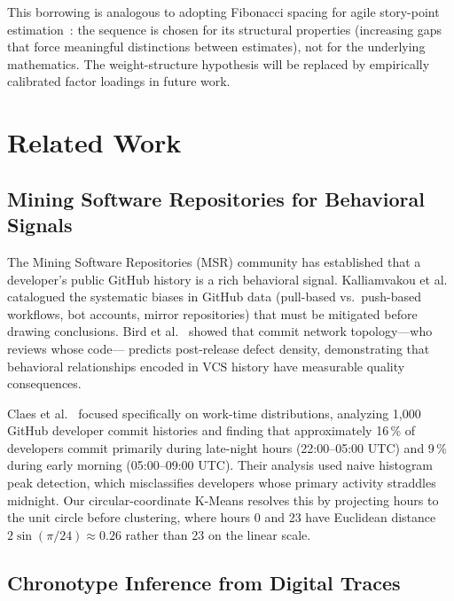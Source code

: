 \documentclass[conference]{IEEEtran}
\begin{document}
This borrowing is analogous to adopting Fibonacci spacing for agile
story-point estimation~\cite{wainer2000}: the sequence is chosen for
its structural properties (increasing gaps that force meaningful
distinctions between estimates), not for the underlying mathematics.
The weight-structure hypothesis will be replaced by empirically
calibrated factor loadings in future work.

\section{Related Work}
\label{sec:related}

\subsection{Mining Software Repositories for Behavioral Signals}

The Mining Software Repositories (MSR) community has established
that a developer's public GitHub history is a rich behavioral
signal.  Kalliamvakou et al.~\cite{kalliamvakou2014} catalogued
the systematic biases in GitHub data (pull-based vs.\ push-based
workflows, bot accounts, mirror repositories) that must be
mitigated before drawing conclusions.  Bird et al.~\cite{bird2009}
showed that commit network topology---who reviews whose code---
predicts post-release defect density, demonstrating that behavioral
relationships encoded in VCS history have measurable quality
consequences.

Claes et al.~\cite{claes2018} focused specifically on work-time
distributions, analyzing 1,000 GitHub developer commit histories and
finding that approximately 16\,\% of developers commit primarily
during late-night hours (22:00--05:00 UTC) and 9\,\% during early
morning (05:00--09:00 UTC).  Their analysis used naive histogram peak
detection, which misclassifies developers whose primary activity
straddles midnight.  Our circular-coordinate K-Means resolves this
by projecting hours to the unit circle before clustering, where
hours 0 and 23 have Euclidean distance $2\sin(\pi/24) \approx 0.26$
rather than 23 on the linear scale.

\subsection{Chronotype Inference from Digital Traces}
\end{document}
